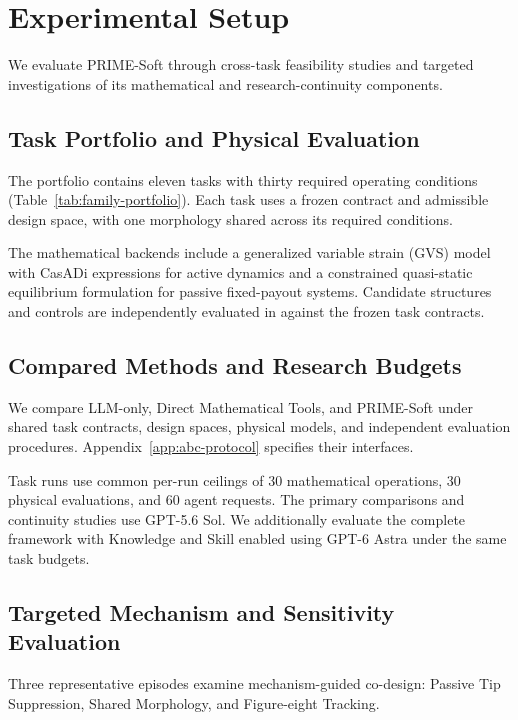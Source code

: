 \section{Experimental Setup}
\label{sec:experimental-setup}
We evaluate PRIME-Soft through cross-task feasibility studies and targeted investigations of its mathematical and research-continuity components.

\subsection{Task Portfolio and Physical Evaluation}
\label{subsec:setup-portfolio}
The portfolio contains eleven tasks with thirty required operating conditions (Table~\ref{tab:family-portfolio}). Each task uses a frozen contract and admissible design space, with one morphology shared across its required conditions.

The mathematical backends include a generalized variable strain (GVS) model with CasADi expressions for active dynamics and a constrained quasi-static equilibrium formulation for passive fixed-payout systems. Candidate structures and controls are independently evaluated in \MuJoCo{} against the frozen task contracts.

\subsection{Compared Methods and Research Budgets}
\label{subsec:setup-comparisons}

We compare LLM-only, Direct Mathematical Tools, and PRIME-Soft under shared task contracts, design spaces, physical models, and independent evaluation procedures. Appendix~\ref{app:abc-protocol} specifies their interfaces.

Task runs use common per-run ceilings of 30 mathematical operations, 30 physical evaluations, and 60 agent requests. The primary comparisons and continuity studies use GPT-5.6 Sol. We additionally evaluate the complete framework with Knowledge and Skill enabled using GPT-6 Astra under the same task budgets.

\subsection{Targeted Mechanism and Sensitivity Evaluation}
\label{subsec:setup-mechanisms}

Three representative episodes examine mechanism-guided co-design: Passive Tip Suppression, Shared Morphology, and Figure-eight Tracking.

